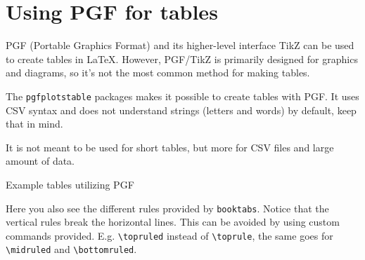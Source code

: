 
\section{Using PGF for tables}
\label{sec:pgf-table}

PGF (Portable Graphics Format) and its higher-level interface TikZ can be used to create tables in LaTeX. However, PGF/TikZ is primarily designed for graphics and diagrams, so it's not the most common method for making tables.

The \verb|pgfplotstable| packages makes it possible to create tables with PGF. It uses CSV syntax and does not understand strings (letters and words) by default, keep that in mind.

It is not meant to be used for short tables, but more for CSV files and large amount of data.

\begin{table}[H]
    \centering\caption{Example tables utilizing PGF}
    \hskip 1cm
    \hskip 1cm
\end{table}

Here you also see the different rules provided by \texttt{booktabs}. Notice that the vertical rules break the horizontal lines. This can be avoided by using custom commands provided. E.g. \verb|\topruled| instead of \verb|\toprule|, the same goes for \verb|\midruled| and \verb|\bottomruled|.